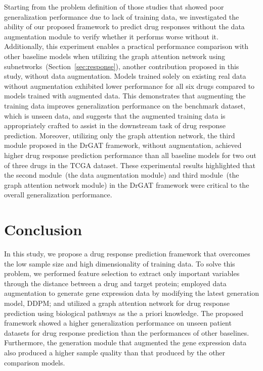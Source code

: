 \documentclass[runningheads]{llncs}
\newcommand{\drdiff}{DrGAT\xspace}
\begin{document}
Starting from the problem definition of those studies that showed poor
generalization performance due to lack of training data, we
investigated the ability of our proposed framework to predict drug
responses without the data augmentation module to verify whether it
performs worse without it. Additionally, this experiment enables a
practical performance comparison with other baseline models when
utilizing the graph attention network using subnetworks~(Section~\ref{sec:response}), another contribution proposed in this study, without data
augmentation. Models trained solely on existing real data without
augmentation exhibited lower performance for all six drugs compared
to models trained with augmented data. This demonstrates that
augmenting the training data improves generalization performance on the benchmark dataset, which is unseen data, and suggests that the augmented training data is appropriately crafted to assist in the downstream task of drug response prediction. Moreover, utilizing only the graph attention network, the third module proposed in the \drdiff framework, without augmentation, achieved higher drug response prediction performance than all baseline models for two out of three drugs in the TCGA dataset. These experimental results highlighted that the second module~(the data augmentation module) and third module~(the graph attention network module) in the \drdiff framework were critical to the overall generalization performance.



\section{Conclusion}

In this study, we propose a drug response prediction framework that overcomes the low sample size and high dimensionality of training data. To solve this problem, we performed feature selection to extract only important variables through the distance between a drug and target protein; employed data augmentation to generate gene expression data by modifying the latest generation model, DDPM; and utilized a graph attention network for drug response prediction using biological pathways as the a priori knowledge. The proposed framework showed a higher generalization performance on unseen patient datasets for drug response prediction than the performances of other baselines. Furthermore, the generation module that augmented the gene expression data also produced a higher sample quality than that produced by the other comparison models.



\end{document}
